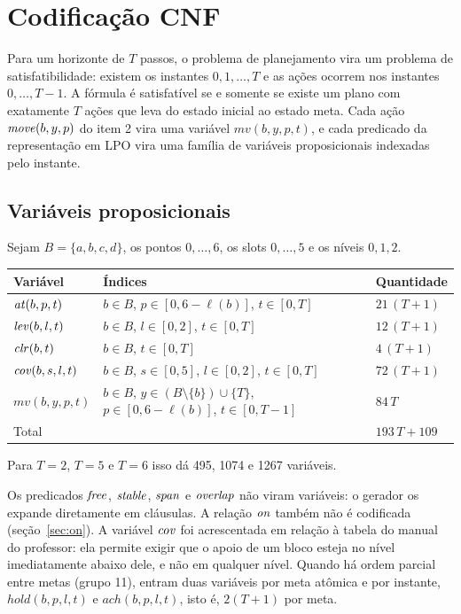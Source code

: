 \section{Codificação CNF}

Para um horizonte de $T$ passos, o problema de planejamento vira um problema de satisfatibilidade:
existem os instantes $0,1,\dots,T$ e as ações ocorrem nos instantes $0,\dots,T-1$.
A fórmula é satisfatível se e somente se existe um plano com exatamente $T$ ações que leva do estado inicial ao estado meta.
Cada ação $\mathit{move}(b,y,p)$ do item 2 vira uma variável $\mathit{mv}(b,y,p,t)$, e cada predicado da representação em LPO vira uma família de variáveis proposicionais indexadas pelo instante.

\subsection{Variáveis proposicionais}

Sejam $B=\{a,b,c,d\}$, os pontos $0,\dots,6$, os slots $0,\dots,5$ e os níveis $0,1,2$.
\begin{center}
\begin{tabular}{p{3.6cm} p{6.6cm} p{3.4cm}}
\toprule
Variável & Índices & Quantidade \\
\midrule
$\mathit{at}(b,p,t)$ & $b\in B$, $p\in[0,6-\ell(b)]$, $t\in[0,T]$ & $21\,(T+1)$ \\
$\mathit{lev}(b,l,t)$ & $b\in B$, $l\in[0,2]$, $t\in[0,T]$ & $12\,(T+1)$ \\
$\mathit{clr}(b,t)$ & $b\in B$, $t\in[0,T]$ & $4\,(T+1)$ \\
$\mathit{cov}(b,s,l,t)$ & $b\in B$, $s\in[0,5]$, $l\in[0,2]$, $t\in[0,T]$ & $72\,(T+1)$ \\
$\mathit{mv}(b,y,p,t)$ & $b\in B$, $y\in (B\setminus\{b\})\cup\{T\}$, $p\in[0,6-\ell(b)]$, $t\in[0,T-1]$ & $84\,T$ \\
\midrule
\multicolumn{2}{l}{Total} & $193\,T+109$ \\
\bottomrule
\end{tabular}
\end{center}
Para $T=2$, $T=5$ e $T=6$ isso dá 495, 1074 e 1267 variáveis.

Os predicados $\mathit{free}$, $\mathit{stable}$, $\mathit{span}$ e $\mathit{overlap}$ não viram variáveis: o gerador os expande diretamente em cláusulas. A relação $\mathit{on}$ também não é codificada (seção~\ref{sec:on}).
A variável $\mathit{cov}$ foi acrescentada em relação à tabela do manual do professor: ela permite exigir que o apoio de um bloco esteja no nível imediatamente abaixo dele, e não em qualquer nível.
Quando há ordem parcial entre metas (grupo 11), entram duas variáveis por meta atômica e por instante, $\mathit{hold}(b,p,l,t)$ e $\mathit{ach}(b,p,l,t)$, isto é, $2(T+1)$ por meta.

